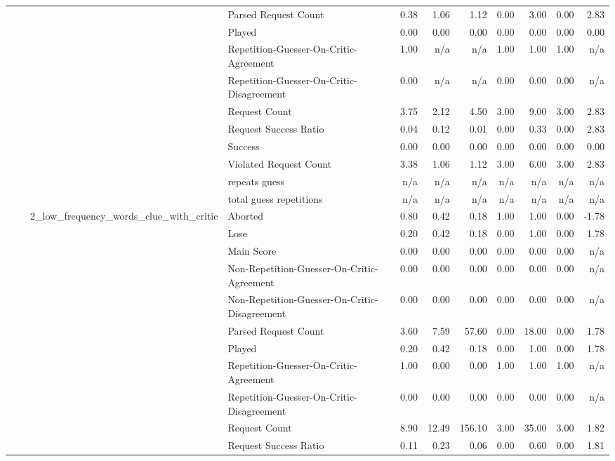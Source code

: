 \begin{tabular}{llllrrrrrrr}
 &  &  & Parsed Request Count & 0.38 & 1.06 & 1.12 & 0.00 & 3.00 & 0.00 & 2.83 \\
 &  &  & Played & 0.00 & 0.00 & 0.00 & 0.00 & 0.00 & 0.00 & 0.00 \\
 &  &  & Repetition-Guesser-On-Critic-Agreement & 1.00 & n/a & n/a & 1.00 & 1.00 & 1.00 & n/a \\
 &  &  & Repetition-Guesser-On-Critic-Disagreement & 0.00 & n/a & n/a & 0.00 & 0.00 & 0.00 & n/a \\
 &  &  & Request Count & 3.75 & 2.12 & 4.50 & 3.00 & 9.00 & 3.00 & 2.83 \\
 &  &  & Request Success Ratio & 0.04 & 0.12 & 0.01 & 0.00 & 0.33 & 0.00 & 2.83 \\
 &  &  & Success & 0.00 & 0.00 & 0.00 & 0.00 & 0.00 & 0.00 & 0.00 \\
 &  &  & Violated Request Count & 3.38 & 1.06 & 1.12 & 3.00 & 6.00 & 3.00 & 2.83 \\
 &  &  & repeats guess & n/a & n/a & n/a & n/a & n/a & n/a & n/a \\
 &  &  & total guess repetitions & n/a & n/a & n/a & n/a & n/a & n/a & n/a \\
\cline{3-11}
 &  & \multirow[t]{15}{*}{2_low_frequency_words_clue_with_critic} & Aborted & 0.80 & 0.42 & 0.18 & 1.00 & 1.00 & 0.00 & -1.78 \\
 &  &  & Lose & 0.20 & 0.42 & 0.18 & 0.00 & 1.00 & 0.00 & 1.78 \\
 &  &  & Main Score & 0.00 & 0.00 & 0.00 & 0.00 & 0.00 & 0.00 & n/a \\
 &  &  & Non-Repetition-Guesser-On-Critic-Agreement & 0.00 & 0.00 & 0.00 & 0.00 & 0.00 & 0.00 & n/a \\
 &  &  & Non-Repetition-Guesser-On-Critic-Disagreement & 0.00 & 0.00 & 0.00 & 0.00 & 0.00 & 0.00 & n/a \\
 &  &  & Parsed Request Count & 3.60 & 7.59 & 57.60 & 0.00 & 18.00 & 0.00 & 1.78 \\
 &  &  & Played & 0.20 & 0.42 & 0.18 & 0.00 & 1.00 & 0.00 & 1.78 \\
 &  &  & Repetition-Guesser-On-Critic-Agreement & 1.00 & 0.00 & 0.00 & 1.00 & 1.00 & 1.00 & n/a \\
 &  &  & Repetition-Guesser-On-Critic-Disagreement & 0.00 & 0.00 & 0.00 & 0.00 & 0.00 & 0.00 & n/a \\
 &  &  & Request Count & 8.90 & 12.49 & 156.10 & 3.00 & 35.00 & 3.00 & 1.82 \\
 &  &  & Request Success Ratio & 0.11 & 0.23 & 0.06 & 0.00 & 0.60 & 0.00 & 1.81 \\

\end{tabular}
